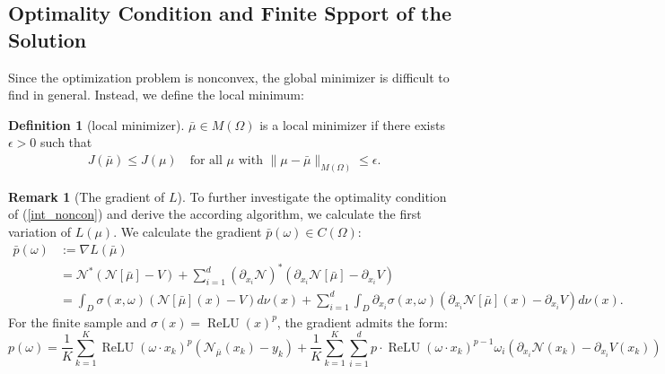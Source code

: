 \documentclass[12pt,fleqn]{amsart}
\theoremstyle{definition}
\newtheorem{definition}{Definition}[section]
\newtheorem{remark}{Remark}
\DeclareMathOperator*{\relu}{ReLU}
\begin{document}
\subsection{Optimality Condition and Finite Spport of the Solution}
Since the optimization problem is nonconvex, the global minimizer is difficult to find in general. 
Instead, we define the local minimum: 
\begin{definition}[local minimizer]
$\bar{\mu} \in M(\Omega)$ is a local minimizer if there exists $\epsilon > 0$ such that 
\begin{align*}
	J(\bar{\mu}) \le J(\mu) \quad \text{for all } \mu \text{ with }  \|\mu - \bar{\mu}\|_{M(\Omega)} \le \epsilon. 
\end{align*}
\end{definition}

\begin{remark}[The gradient of $L$]
To further investigate the optimality condition of (\ref{int_noncon}) and derive the according algorithm, we calculate the first variation of $L(\mu)$.
We calculate the gradient $\bar{p}(\omega) \in C(\Omega)$:
 \begin{equation}
 \begin{aligned}
 	\bar{p}(\omega) &:= \nabla L(\bar{\mu}) \\
 	& =  \mathcal{N}^*(\mathcal{N}[\bar{\mu}] - V) + \sum_{i = 1}^d (\partial_{x_i} \mathcal{N})^*( \partial_{x_i} \mathcal{N}[\bar{\mu}] - \partial_{x_i} V ) \\
 	& = \int_D \sigma(x, \omega) (\mathcal{N}[\bar{\mu}](x) - V) d\nu(x) + \sum_{i = 1}^d \int_D \partial_{x_i} \sigma(x, \omega) ( \partial_{x_i} \mathcal{N}[\bar{\mu}](x) - \partial_{x_i}V ) d\nu(x) .
 	 \end{aligned}
 \end{equation}
 For the finite sample and $\sigma(x) = \relu(x)^p$, the gradient admits the form:
 \begin{equation*}
 	p(\omega) = \frac{1}{K} \sum_{k = 1}^K  \relu(\omega \cdot x_k)^p (\mathcal{N}_{\bar{\mu}}(x_k) - y_k) + 
 	\frac{1}{K} \sum_{k = 1}^K \sum_{i = 1}^d p \cdot \relu( \omega \cdot x_k )^{ p -1}  \omega_i (\partial_{x_i} \mathcal{N}(x_k) - \partial_{x_i}V(x_k))
 \end{equation*}
\end{remark} 
 
\end{document}
